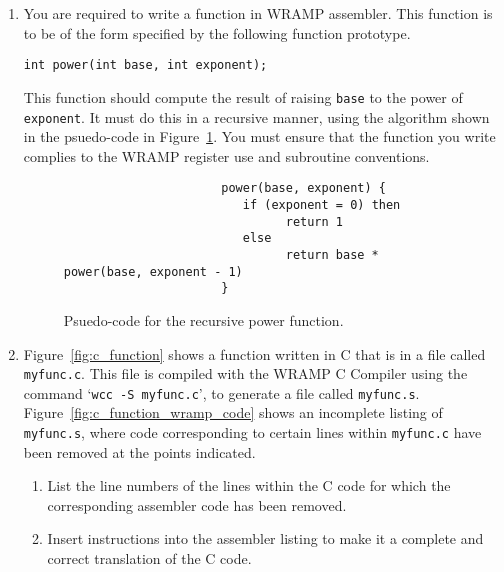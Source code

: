 \documentclass[a4paper,10pt]{article}
\begin{document}
\begin{enumerate}
\newpage
\item You are required to write a function in WRAMP assembler.
This function is to be of the form specified by the following function prototype.

{\small
\begin{verbatim}
int power(int base, int exponent);
\end{verbatim}
} 

This function should compute the result of raising \texttt{base} to the power of \texttt{exponent}.
It must do this in a recursive manner, using the algorithm shown in the psuedo-code in Figure~\ref{fig:power_psuedocode}.
You must ensure that the function you write complies to the WRAMP register use and subroutine conventions.

\begin{figure}[h]
{\small
\begin{center}
\begin{verbatim}
                      power(base, exponent) {
                         if (exponent = 0) then
                               return 1
                         else
                               return base * power(base, exponent - 1)
                      }
\end{verbatim}
\end{center}
} 
\caption{Psuedo-code for the recursive power function.}
\label{fig:power_psuedocode}
\end{figure}


\newpage



\item Figure~\ref{fig:c_function} shows a function written in C that is in a file called \texttt{myfunc.c}. This file is compiled with the WRAMP C Compiler using the command `\texttt{wcc -S myfunc.c}', to generate a file called \texttt{myfunc.s}.
Figure~\ref{fig:c_function_wramp_code} shows an incomplete listing of \texttt{myfunc.s}, where code corresponding to certain lines
within \texttt{myfunc.c} have been removed at the points indicated.

\begin{enumerate}
\item List the line numbers of the lines within the C code for which the corresponding assembler code has been removed.
\item Insert instructions into the assembler listing to make it a complete and correct translation of the C code.
\end{enumerate}


\end{enumerate}
\end{document}
